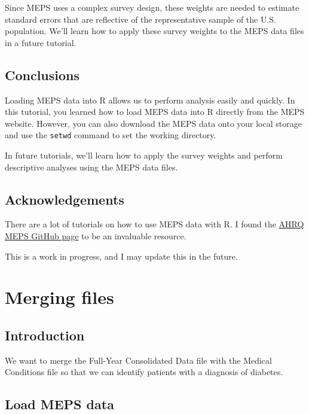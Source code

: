 \documentclass[
]{book}
\begin{document}
Since MEPS uses a complex survey design, these weights are needed to estimate standard errors that are reflective of the representative sample of the U.S. population. We'll learn how to apply these survey weights to the MEPS data files in a future tutorial.

\hypertarget{conclusions}{%
\section{Conclusions}\label{conclusions}}

Loading MEPS data into R allows us to perform analysis easily and quickly. In this tutorial, you learned how to load MEPS data into R directly from the MEPS website. However, you can also download the MEPS data onto your local storage and use the \texttt{setwd} command to set the working directory.

In future tutorials, we'll learn how to apply the survey weights and perform descriptive analyses using the MEPS data files.

\hypertarget{acknowledgements}{%
\section{Acknowledgements}\label{acknowledgements}}

There are a lot of tutorials on how to use MEPS data with R. I found the \href{https://github.com/HHS-AHRQ/MEPS}{AHRQ MEPS GitHub page} to be an invaluable resource.

This is a work in progress, and I may update this in the future.

\hypertarget{merging}{%
\chapter{Merging files}\label{merging}}

\hypertarget{introduction-1}{%
\section{Introduction}\label{introduction-1}}

We want to merge the Full-Year Consolidated Data file with the Medical Conditions file so that we can identify patients with a diagnosis of diabetes.

\hypertarget{load-meps-data}{%
\section{Load MEPS data}\label{load-meps-data}}
\end{document}
